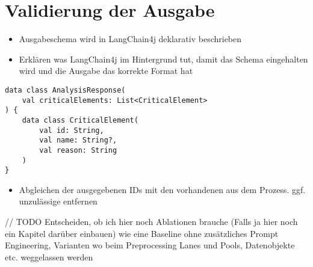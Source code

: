 \section{Validierung der Ausgabe}\label{sec:validierung-der-ausgabe}

\begin{itemize}
    \item Ausgabeschema wird in LangChain4j deklarativ beschrieben
    \item Erklären was LangChain4j im Hintergrund tut, damit das Schema eingehalten wird und die Ausgabe das korrekte Format hat
\end{itemize}

\begin{verbatim}
data class AnalysisResponse(
    val criticalElements: List<CriticalElement>
) {
    data class CriticalElement(
        val id: String,
        val name: String?,
        val reason: String
    )
}
\end{verbatim}

\begin{itemize}
    \item Abgleichen der ausgegebenen IDs mit den vorhandenen aus dem Prozess. ggf. unzulässige entfernen
\end{itemize}

// TODO Entscheiden, ob ich hier noch Ablationen brauche (Falls ja hier noch ein Kapitel darüber einbauen) wie eine Baseline ohne zusätzliches Prompt Engineering, Varianten wo beim Preprocessing Lanes und Pools, Datenobjekte etc. weggelassen werden